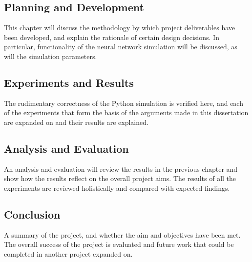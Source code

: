 \subsection*{Planning and Development}
This chapter will discuss the methodology by which project deliverables have
been developed, and explain the rationale of certain design decisions. In
particular, functionality of the neural network simulation will be
discussed, as will the simulation parameters.

\subsection*{Experiments and Results}
The rudimentary correctness of the Python simulation is verified here, and each
of the experiments that form the basis of the arguments made in this
dissertation are expanded on and their results are explained. 

\subsection*{Analysis and Evaluation}
An analysis and evaluation will review the results in the previous chapter and
show how the results reflect on the overall project aims. The results of all the experiments are reviewed holistically and compared with
expected findings. 
\subsection*{Conclusion}
A summary of the project, and whether the aim and objectives have been met. The
overall success of the project is evaluated and future work that could be
completed in another project expanded on.